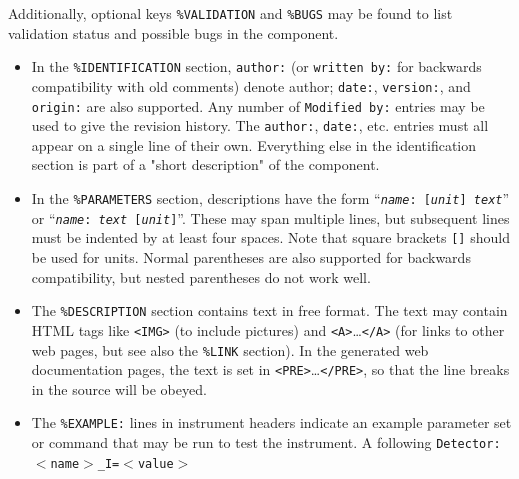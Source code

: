 Additionally, optional keys \verb+%VALIDATION+ and \verb+%BUGS+ may be found to list validation status and possible bugs in the component.

\begin{itemize}
\item
  In the \verb+%IDENTIFICATION+
  section, \verb+author:+ (or \verb+written by:+ for backwards
  compatibility with old comments) denote author; \verb+date:+,
  \verb+version:+, and \verb+origin:+ are also supported. Any number of
  \verb+Modified by:+ entries may be used to give the revision history.
  The \verb+author:+, \verb+date:+, etc. entries must all
  appear on a single line of their own. Everything else in the
  identification section is part of a "short description" of the
  component.
\item
  In the \verb+%PARAMETERS+
  section, descriptions have the form
  \hbox{``\texttt{\textit{name\/}:~[\textit{unit\/}] \textit{text\/}}''}
  or \hbox{``\texttt{\textit{name\/}:~\textit{text\/} [\textit{unit\/}]}''}.
  These may span multiple lines, but subsequent lines must be
  indented by at least four spaces. Note that square brackets \verb+[]+ should
  be used for units. Normal parentheses are also supported for backwards
  compatibility, but nested parentheses do not work well.
\item
  The \verb+%DESCRIPTION+
  section contains text in free format. The text may contain HTML tags
  like \verb+<IMG>+ (to include pictures) and
  \verb+<A>+\ldots\verb+</A>+
  (for links to other web pages, but see also the \verb+%LINK+
  section). In the generated web documentation pages, the text is set in
  \verb+<PRE>+\ldots\verb+</PRE>+, so that the line breaks in the source
  will be obeyed.
\item 
  \sloppy
  The \verb+%EXAMPLE:+
  lines in instrument headers indicate an example parameter set or command that may be
  run to test the instrument. A following \texttt{Detector: $<$name$>$\_I=$<$value$>$}

\end{itemize}
